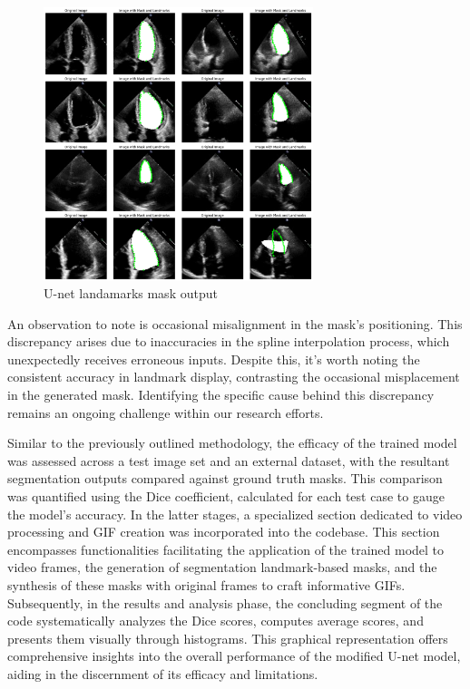 \documentclass[runningheads]{llncs}
\begin{document}
\begin{figure}[H]
    \centering
    \includegraphics[width=0.7\textwidth]{output.png}
    \caption{U-net landamarks mask output}
    \label{fig:output}
\end{figure}
An observation to note is occasional misalignment in the mask's positioning. This discrepancy arises due to inaccuracies in the spline interpolation process, which unexpectedly receives erroneous inputs. Despite this, it's worth noting the consistent accuracy in landmark display, contrasting the occasional misplacement in the generated mask. Identifying the specific cause behind this discrepancy remains an ongoing challenge within our research efforts.

Similar to the previously outlined methodology, the efficacy of the trained model was assessed across a test image set and an external dataset, with the resultant segmentation outputs compared against ground truth masks. This comparison was quantified using the Dice coefficient, calculated for each test case to gauge the model's accuracy. In the latter stages, a specialized section dedicated to video processing and GIF creation was incorporated into the codebase. This section encompasses functionalities facilitating the application of the trained model to video frames, the generation of segmentation landmark-based masks, and the synthesis of these masks with original frames to craft informative GIFs. Subsequently, in the results and analysis phase, the concluding segment of the code systematically analyzes the Dice scores, computes average scores, and presents them visually through histograms. This graphical representation offers comprehensive insights into the overall performance of the modified U-net model, aiding in the discernment of its efficacy and limitations.
\end{document}
